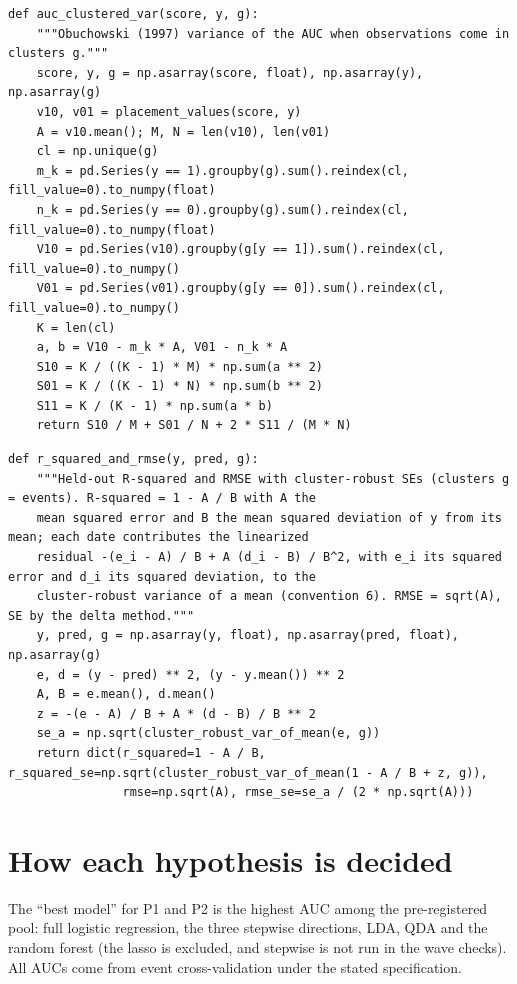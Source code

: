 \documentclass[11pt]{article}
\begin{document}
\begin{lstlisting}[caption={Clustered AUC variance (Obuchowski 1997) (scripts/modeling.py)}]
def auc_clustered_var(score, y, g):
    """Obuchowski (1997) variance of the AUC when observations come in clusters g."""
    score, y, g = np.asarray(score, float), np.asarray(y), np.asarray(g)
    v10, v01 = placement_values(score, y)
    A = v10.mean(); M, N = len(v10), len(v01)
    cl = np.unique(g)
    m_k = pd.Series(y == 1).groupby(g).sum().reindex(cl, fill_value=0).to_numpy(float)
    n_k = pd.Series(y == 0).groupby(g).sum().reindex(cl, fill_value=0).to_numpy(float)
    V10 = pd.Series(v10).groupby(g[y == 1]).sum().reindex(cl, fill_value=0).to_numpy()
    V01 = pd.Series(v01).groupby(g[y == 0]).sum().reindex(cl, fill_value=0).to_numpy()
    K = len(cl)
    a, b = V10 - m_k * A, V01 - n_k * A
    S10 = K / ((K - 1) * M) * np.sum(a ** 2)
    S01 = K / ((K - 1) * N) * np.sum(b ** 2)
    S11 = K / (K - 1) * np.sum(a * b)
    return S10 / M + S01 / N + 2 * S11 / (M * N)
\end{lstlisting}

\begin{lstlisting}[caption={Liking R-squared and RMSE with their error bars (scripts/modeling.py)}]
def r_squared_and_rmse(y, pred, g):
    """Held-out R-squared and RMSE with cluster-robust SEs (clusters g = events). R-squared = 1 - A / B with A the
    mean squared error and B the mean squared deviation of y from its mean; each date contributes the linearized
    residual -(e_i - A) / B + A (d_i - B) / B^2, with e_i its squared error and d_i its squared deviation, to the
    cluster-robust variance of a mean (convention 6). RMSE = sqrt(A), SE by the delta method."""
    y, pred, g = np.asarray(y, float), np.asarray(pred, float), np.asarray(g)
    e, d = (y - pred) ** 2, (y - y.mean()) ** 2
    A, B = e.mean(), d.mean()
    z = -(e - A) / B + A * (d - B) / B ** 2
    se_a = np.sqrt(cluster_robust_var_of_mean(e, g))
    return dict(r_squared=1 - A / B, r_squared_se=np.sqrt(cluster_robust_var_of_mean(1 - A / B + z, g)),
                rmse=np.sqrt(A), rmse_se=se_a / (2 * np.sqrt(A)))
\end{lstlisting}

\section{How each hypothesis is decided}

The ``best model'' for P1 and P2 is the highest AUC among the pre-registered pool: full logistic regression, the three stepwise directions, LDA, QDA and the random forest (the lasso is excluded, and stepwise is not run in the wave checks). All AUCs come from event cross-validation under the stated specification.
\end{document}

